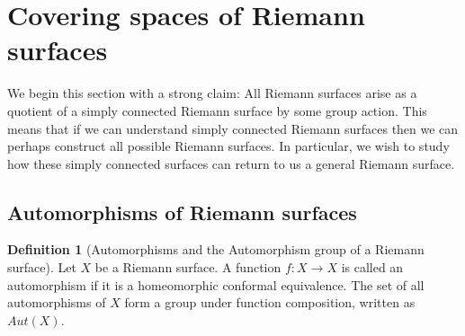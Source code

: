\documentclass[11pt]{report}
\theoremstyle{definition}
\newtheorem{defn}[thm]{Definition}
\begin{document}
\section{Covering spaces of Riemann surfaces}
We begin this section with a strong claim: All Riemann surfaces arise as a quotient of a simply connected Riemann surface by some group action. This means that if we can understand simply connected Riemann surfaces then we can perhaps construct all possible Riemann surfaces. In particular, we wish to study how these simply connected surfaces can return to us a general Riemann surface.
\subsection{Automorphisms of Riemann surfaces}

\begin{defn}[Automorphisms and the Automorphism group of a Riemann surface]
  Let $X$ be a Riemann surface. A function $f\colon X \rightarrow X$ is called an automorphism if it is a homeomorphic conformal equivalence. The set of all automorphisms of $X$ form a group under function composition, written as $Aut(X)$.
\end{defn}
\end{document}

